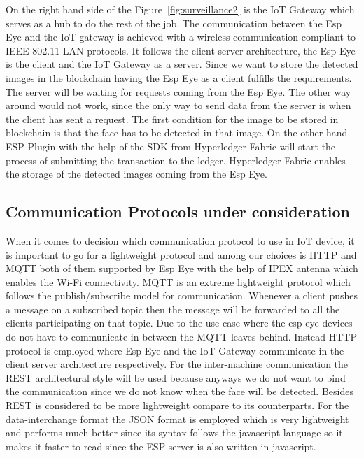 On the right hand side of the Figure~\ref{fig:surveillance2} is the IoT Gateway which serves as a hub to do the rest of the job. The communication between the Esp Eye and the IoT gateway is achieved with a wireless communication compliant to IEEE 802.11 LAN protocols. It follows the client-server architecture, the Esp Eye is the client and the IoT Gateway as a server. Since we want to store the detected images in the blockchain having the Esp Eye as a client fulfills the requirements. The server will be waiting for requests coming from the Esp Eye. The other way around would not work, since the only way to send data from the server is when the client has sent a request. The first condition for the image to be stored in blockchain is that the face has to be detected in that image. On the other hand ESP Plugin with the help of the SDK from Hyperledger Fabric will start the process of submitting the transaction to the ledger. Hyperledger Fabric enables the storage of the detected images coming from the Esp Eye.   

\subsection{Communication Protocols under consideration}
When it comes to decision which communication protocol to use in IoT device, it is important to go for a lightweight protocol and among our choices is HTTP and MQTT both of them supported by Esp Eye with the help of IPEX antenna which enables the Wi-Fi connectivity. MQTT is an extreme lightweight protocol which follows the publish/subscribe model for communication. Whenever a client pushes a message on a subscribed topic then the message will be forwarded to all the clients participating on that topic. Due to the use case where the esp eye devices do not have to communicate in between the MQTT leaves behind. 
Instead HTTP protocol is employed where Esp Eye and the IoT Gateway communicate in the client server architecture respectively. For the inter-machine communication the REST architectural style will be used because anyways we do not want to bind the communication since we do not know when the face will be detected. Besides REST is considered to be more lightweight compare to its counterparts. For the data-interchange format the JSON format is employed which is very lightweight and performs much better since its syntax follows the javascript language so it makes it faster to read since the ESP server is also written in javascript.  
